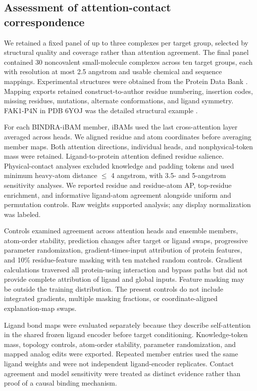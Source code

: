 \documentclass[12pt,a4paper]{article}
\begin{document}
\subsection*{Assessment of attention-contact correspondence}
We retained a fixed panel of up to three complexes per target group, selected by structural quality and coverage rather than attention agreement. The final panel contained 30 noncovalent small-molecule complexes across ten target groups, each with resolution at most 2.5 angstrom and usable chemical and sequence mappings. Experimental structures were obtained from the Protein Data Bank \citep{pdb2000}. Mapping exports retained construct-to-author residue numbering, insertion codes, missing residues, mutations, alternate conformations, and ligand symmetry. FAK1-P4N in PDB 6YOJ was the detailed structural example \citep{pdb6yoj}.

For each BINDRA-iBAM member, iBAMs used the last cross-attention layer averaged across heads. We aligned residue and atom coordinates before averaging member maps. Both attention directions, individual heads, and nonphysical-token mass were retained. Ligand-to-protein attention defined residue salience. Physical-contact analyses excluded knowledge and padding tokens and used minimum heavy-atom distance \(\leq\) 4 angstrom, with 3.5- and 5-angstrom sensitivity analyses. We reported residue and residue-atom AP, top-residue enrichment, and informative ligand-atom agreement alongside uniform and permutation controls. Raw weights supported analysis; any display normalization was labeled.

Controls examined agreement across attention heads and ensemble members, atom-order stability, prediction changes after target or ligand swaps, progressive parameter randomization, gradient-times-input attribution of protein features, and 10\% residue-feature masking with ten matched random controls. Gradient calculations traversed all protein-using interaction and bypass paths but did not provide complete attribution of ligand and global inputs. Feature masking may be outside the training distribution. The present controls do not include integrated gradients, multiple masking fractions, or coordinate-aligned explanation-map swaps.

Ligand bond maps were evaluated separately because they describe self-attention in the shared frozen ligand encoder before target conditioning. Knowledge-token mass, topology controls, atom-order stability, parameter randomization, and mapped analog edits were exported. Repeated member entries used the same ligand weights and were not independent ligand-encoder replicates. Contact agreement and model sensitivity were treated as distinct evidence rather than proof of a causal binding mechanism.
\end{document}
